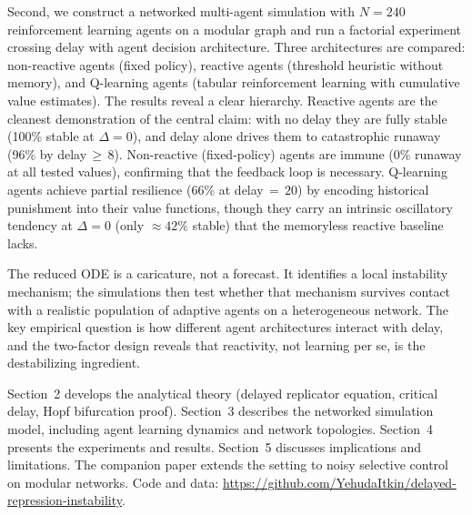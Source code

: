 Second, we construct a networked multi-agent simulation with $N=240$ reinforcement learning agents on a modular graph and run a factorial experiment crossing delay with agent decision architecture. Three architectures are compared: non-reactive agents (fixed policy), reactive agents (threshold heuristic without memory), and Q-learning agents (tabular reinforcement learning with cumulative value estimates). The results reveal a clear hierarchy. Reactive agents are the cleanest demonstration of the central claim: with no delay they are fully stable (100\% stable at $\Delta=0$), and delay alone drives them to catastrophic runaway (96\% by delay$\,{\geq}\,8$). Non-reactive (fixed-policy) agents are immune (0\% runaway at all tested values), confirming that the feedback loop is necessary. Q-learning agents achieve partial resilience (66\% at delay${}\,{=}\,20$) by encoding historical punishment into their value functions, though they carry an intrinsic oscillatory tendency at $\Delta=0$ (only ${\approx}42\%$ stable) that the memoryless reactive baseline lacks.

The reduced ODE is a caricature, not a forecast. It identifies a local instability mechanism; the simulations then test whether that mechanism survives contact with a realistic population of adaptive agents on a heterogeneous network. The key empirical question is how different agent architectures interact with delay, and the two-factor design reveals that reactivity, not learning per se, is the destabilizing ingredient.

Section~2 develops the analytical theory (delayed replicator equation, critical delay, Hopf bifurcation proof). Section~3 describes the networked simulation model, including agent learning dynamics and network topologies. Section~4 presents the experiments and results. Section~5 discusses implications and limitations. The companion paper extends the setting to noisy selective control on modular networks. Code and data: \url{https://github.com/YehudaItkin/delayed-repression-instability}.
